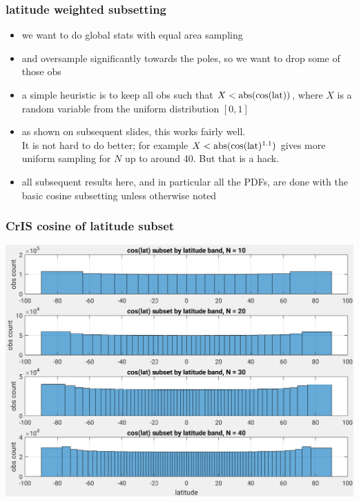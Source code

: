 \documentclass[11pt]{beamer}
\begin{document}
\begin{frame}
\frametitle{latitude weighted subsetting}

\begin{itemize}

  \item we want to do global stats with equal area sampling

  \item {\airs} and {\cris} oversample significantly towards the
    poles, so we want to drop some of those obs

  \item a simple heuristic is to keep all obs such that $X <
    \mbox{abs}(\cos(\mbox{lat}))$, where $X$ is a random variable from the
    uniform distribution $[0, 1]$

  \item as shown on subsequent slides, this works fairly well. \\ It
    is not hard to do better; for example $X <
    \mbox{abs}(\cos(\mbox{lat})^{1.1})$ gives more uniform sampling for $N$ up
    to around 40.  But that is a hack.

  \item all subsequent results here, and in particular all the PDFs,
    are done with the basic cosine subsetting unless otherwise noted

\end{itemize}
\end{frame}
\begin{frame}
\frametitle{CrIS cosine of latitude subset}
\begin{center}
  \includegraphics[scale=0.5]{figures/cris_cos_lat_subset.pdf}
\end{center}
\end{frame} %
\end{document}
